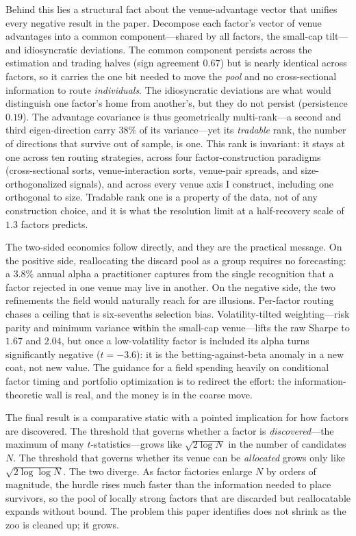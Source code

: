 \documentclass[12pt]{article}
\theoremstyle{plain}
\theoremstyle{definition}
\begin{document}
Behind this lies a structural fact about the venue-advantage vector that unifies
every negative result in the paper. Decompose each factor's vector of venue
advantages into a common component---shared by all factors, the small-cap
tilt---and idiosyncratic deviations. The common component persists across the
estimation and trading halves (sign agreement $0.67$) but is nearly identical
across factors, so it carries the one bit needed to move the \emph{pool} and no
cross-sectional information to route \emph{individuals}. The idiosyncratic
deviations are what would distinguish one factor's home from another's, but they
do not persist (persistence $0.19$). The advantage covariance is thus
geometrically multi-rank---a second and third eigen-direction carry $38\%$ of its
variance---yet its \emph{tradable} rank, the number of directions that survive
out of sample, is one. This rank is invariant: it stays at one across ten
routing strategies, across four factor-construction paradigms (cross-sectional
sorts, venue-interaction sorts, venue-pair spreads, and size-orthogonalized
signals), and across every venue axis I construct, including one orthogonal to
size. Tradable rank one is a property of the data, not of any construction
choice, and it is what the resolution limit at a half-recovery scale of $1.3$
factors predicts.

The two-sided economics follow directly, and they are the practical message. On
the positive side, reallocating the discard pool as a group requires no
forecasting: a $3.8\%$ annual alpha a practitioner captures from the single
recognition that a factor rejected in one venue may live in another. On the
negative side, the two refinements the field would naturally reach for are
illusions. Per-factor routing chases a ceiling that is six-sevenths selection
bias. Volatility-tilted weighting---risk parity and minimum variance within the
small-cap venue---lifts the raw Sharpe to $1.67$ and $2.04$, but once a
low-volatility factor is included its alpha turns significantly negative
($t=-3.6$): it is the betting-against-beta anomaly \citep{FrazziniPedersen2014}
in a new coat, not new value. The guidance for a field spending heavily on
conditional factor timing and portfolio optimization is to redirect the effort:
the information-theoretic wall is real, and the money is in the coarse move.

The final result is a comparative static with a pointed implication for how
factors are discovered. The threshold that governs whether a factor is
\emph{discovered}---the maximum of many $t$-statistics---grows like
$\sqrt{2\log N}$ in the number of candidates $N$. The threshold that governs
whether its venue can be \emph{allocated} grows only like $\sqrt{2\log\log N}$.
The two diverge. As factor factories enlarge $N$ by orders of magnitude, the
hurdle rises much faster than the information needed to place survivors, so the
pool of locally strong factors that are discarded but reallocatable expands
without bound. The problem this paper identifies does not shrink as the zoo is
cleaned up; it grows.
\end{document}
